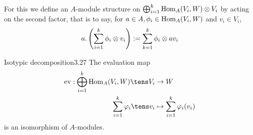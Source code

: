 \documentclass[twoside = false,	%
		headsepline,		%
		parskip = true,
		]{scrbook}						%
\begin{document}
        For this we define an $A$-module structure on $\bigoplus_{i=1}^k \mathrm{Hom}_A(V_i,W)\otimes V_i$ by acting on the second factor, that is to say, for $a\in A, \phi_i \in \mathrm{Hom}_A(V_i,W)$ and $v_i\in V_i$, 
        $$a.\left( \sum_{i=1}^k\phi_i\otimes v_i\right) := \sum_{k=1}^k \phi_i\otimes av_i$$
        \begin{proposition}{Isotypic decomposition}{3.27}
            The evaluation map
            \begin{equation*}
            \begin{split}
                \ev: \bigoplus_{i=1}^k \Hom_A(V_i,W) \tens V_i &\to W \\
                    \sum_{i=1}^k \varphi_i \tens v_i &\mapsto \sum_{i=1}^k \varphi_i(v_i)
            \end{split}
            \end{equation*}
            is an isomorphism of $A$-modules.
        \end{proposition}
\end{document}
